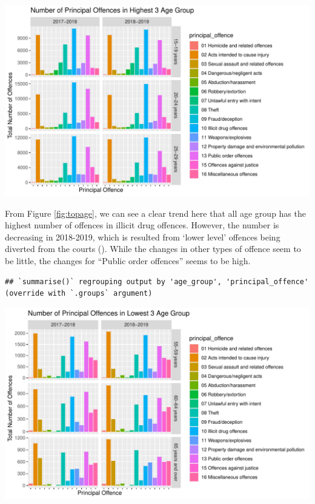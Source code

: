 \documentclass[11pt,a4paper,]{article}
\let\origfigure\figure
\let\endorigfigure\endfigure
\renewenvironment{figure}[1][2] {
\expandafter\origfigure\expandafter[H]
} {
\endorigfigure
}
\begin{document}
\begin{figure}
\centering
\includegraphics{ETC5513-Assignment4_files/figure-latex/topage-1.pdf}
\caption{\label{fig:topage}Top three highest age group principal offences}
\end{figure}

From Figure \ref{fig:topage}, we can see a clear trend here that all age group has the highest number of offences in illicit drug offences. However, the number is decreasing in 2018-2019, which is resulted from `lower level' offences being diverted from the courts (\textcite{AIHW}). While the changes in other types of offence seem to be little, the changes for ``Public order offences'' seems to be high.

\begin{verbatim}
## `summarise()` regrouping output by 'age_group', 'principal_offence' (override with `.groups` argument)
\end{verbatim}

\begin{figure}
\centering
\includegraphics{ETC5513-Assignment4_files/figure-latex/lowestage-1.pdf}
\caption{\label{fig:lowestage}Lowest three highest age group principal offences}
\end{figure}
\end{document}
